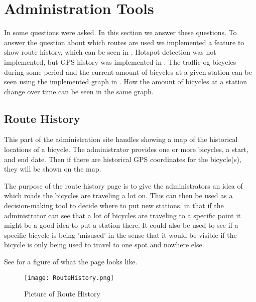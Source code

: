 \section{Administration Tools}\label{sec:impAdminTools}
In  some questions were asked. 
In this section we answer these questions.
To answer the question about which routes are used we implemented a feature to show route history, which can be seen in .
Hotspot detection was not implemented, but GPS history was implemented in .
The traffic og bicycles during some period and the current amount of bicycles at a given station can be seen using the implemented graph in .
How the amount of bicycles at a station change over time can be seen in the same graph.

\subsection{Route History}\label{sec:routeHistory}
This part of the administration site handles showing a map of the historical locations of a bicycle.
The administrator provides one or more bicycles, a start, and end date.
Then if there are historical GPS coordinates for the bicycle(s), they will be shown on the map. 

The purpose of the route history page is to give the administrators an idea of which roads the bicycles are traveling a lot on. 
This can then be used as a decision-making tool to decide where to put new stations, in that if the administrator can see that a lot of bicycles are traveling to a specific point it might be a good idea to put a station there.
It could also be used to see if a specific bicycle is being 'misused' in the sense that it would be visible if the bicycle is only being used to travel to one spot and nowhere else.

See  for a figure of what the page looks like.

\begin{figure}[H]
	\centering
	\texttt{[image: RouteHistory.png]}
	\caption{Picture of Route History}
	\label{fig:routehistory}
\end{figure}

